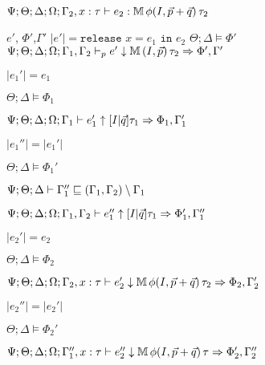 {{{     $\Psi ; \Theta ; \Delta ; \Omega ; \Gamma_2, x : \tau \vdash e_2 : \mathbb{M} \, \phi(I,\vec{p} + \vec{q}) \, \tau_2$

  }{
    $e'$, $\Phi'$,$\Gamma'$  
  }{
    $|e'| = \texttt{release } x = e_1 \texttt{ in }e_2$
  }{
    $\Theta ; \Delta \vDash \Phi'$  
  }{
    $\Psi ; \Theta ; \Delta ; \Omega ; \Gamma_1,\Gamma_2 \vdash_p e' \downarrow \mathbb{M} \, (I,\vec{p}) \, \tau_2 \Rightarrow \Phi',\Gamma'$  
  }


   $|e_1'| = e_1$

   $\Theta ; \Delta \vDash \Phi_1$

   $\Psi ; \Theta ; \Delta ; \Omega ; \Gamma_1 \vdash e_1' \uparrow [I|\vec{q}] \tau_1 \Rightarrow \Phi_1,\Gamma_1'$


   $|e_1''| = |e_1'|$

   $\Theta ; \Delta \vDash \Phi_1'$

   $\Psi ; \Theta ; \Delta \vdash \Gamma_1'' \sqsubseteq (\Gamma_1,\Gamma_2) \setminus \Gamma_1$

   $\Psi ; \Theta ; \Delta ; \Omega ; \Gamma_1,\Gamma_2 \vdash e_1'' \uparrow [I|\vec{q}] \tau_1 \Rightarrow \Phi_1',\Gamma_1''$


   $|e_2'| = e_2$

   $\Theta ; \Delta \vDash \Phi_2$

   $\Psi ; \Theta ; \Delta ; \Omega ; \Gamma_2, x : \tau \vdash e_2' \downarrow \mathbb{M} \, \phi(I,\vec{p} + \vec{q}) \, \tau_2 \Rightarrow \Phi_2,\Gamma_2'$


   $|e_2''| = |e_2'|$

   $\Theta ; \Delta \vDash \Phi_2'$

   $\Psi ; \Theta ; \Delta ; \Omega ; \Gamma_1'', x : \tau \vdash e_2'' \downarrow \mathbb{M} \, \phi(I,\vec{p} + \vec{q}) \, \tau \Rightarrow \Phi_2',\Gamma_2''$


}}
